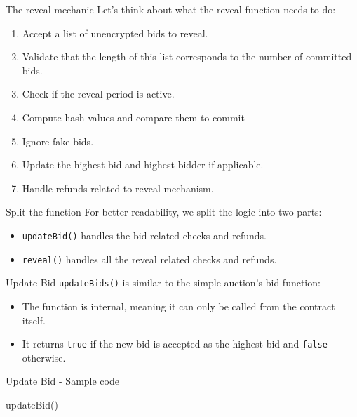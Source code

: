 \documentclass[]{beamer}
\begin{document}
\begin{frame}{The reveal mechanic}
	Let's think about what the reveal function needs to do:
	\begin{enumerate}
		\item<2-> Accept a list of unencrypted bids to reveal.
		\item<3-> Validate that the length of this list corresponds to the number of committed bids.
		\item<4-> Check if the reveal period is active.
		\item<5-> Compute hash values and compare them to commit
		\item<6-> Ignore fake bids.
		\item<7-> Update the highest bid and highest bidder if applicable.
		\item<8-> Handle refunds related to reveal mechanism.
	\end{enumerate}
\end{frame}

\begin{frame}{Split the function}
For better readability, we split the logic into two parts:
	\begin{itemize}
		\item<2-> \texttt{updateBid()} handles the bid related checks and refunds.
		\item<3-> \texttt{reveal()} handles all the reveal related checks and refunds.
	\end{itemize}
\end{frame}

\begin{frame}{Update Bid}
\texttt{updateBids()} is similar to the simple auction's bid function:
	\begin{itemize}
		\item<2-> The function is internal, meaning it can only be called from the contract itself.
		\item<3-> It returns \texttt{true} if the new bid is accepted as the highest bid and \texttt{false} otherwise.
	\end{itemize} 	
\end{frame}

\begin{frame}{Update Bid - Sample code}
	\begin{samplecode}{updateBid()}
		
	\end{samplecode}
\end{frame}
\end{document}
